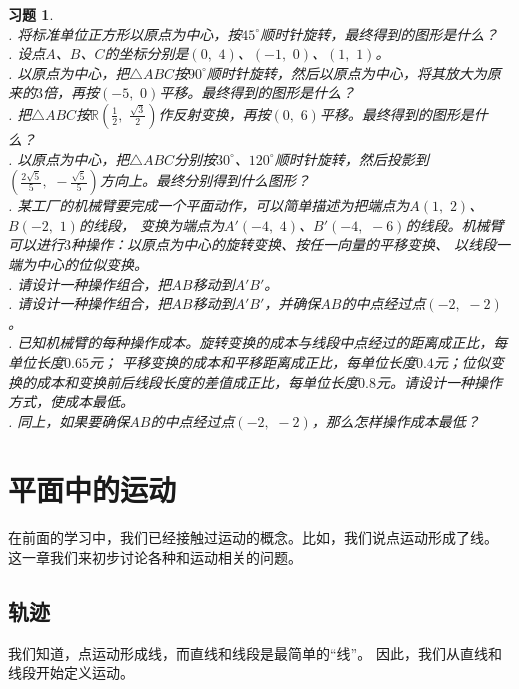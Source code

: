 \documentclass[12pt,UTF8]{ctexbook}
\theoremstyle{definition}
\theoremstyle{plain}
\newtheorem{xt}{习题}[section]
\begin{document}
\begin{xt}
    \mbox{}\\
    . 将标准单位正方形以原点为中心，按$45^\circ$顺时针旋转，最终得到的图形是什么？\\
    . 设点$A$、$B$、$C$的坐标分别是$(0,\,\, 4)$、$(-1,\,\, 0)$、$(1,\,\,1)$。\\
    . 以原点为中心，把$\triangle ABC$按$90^\circ$顺时针旋转，然后以原点为中心，将其放大为原来的$3$倍，再按$(-5, \,\, 0)$平移。最终得到的图形是什么？\\
    . 把$\triangle ABC$按$\mathbb{R}\left(\frac{1}{2},\,\, \frac{\sqrt{3}}{2}\right)$作反射变换，再按$(0,\,\, 6)$平移。最终得到的图形是什么？\\
    . 以原点为中心，把$\triangle ABC$分别按$30^\circ$、$120^\circ$顺时针旋转，然后投影到$\left(\frac{2\sqrt{5}}{5},\,\, -\frac{\sqrt{5}}{5}\right)$方向上。最终分别得到什么图形？\\
    . 某工厂的机械臂要完成一个平面动作，可以简单描述为把端点为$A(1,\,\, 2)$、$B(-2,\,\, 1)$的线段，
    变换为端点为$A'(-4,\,\, 4)$、$B'(-4,\,\, -6)$的线段。机械臂可以进行$3$种操作：以原点为中心的旋转变换、按任一向量的平移变换、
    以线段一端为中心的位似变换。\\
    . 请设计一种操作组合，把$AB$移动到$A'B'$。\\
    . 请设计一种操作组合，把$AB$移动到$A'B'$，并确保$AB$的中点经过点$(-2,\,\, -2)$。\\
    . 已知机械臂的每种操作成本。旋转变换的成本与线段中点经过的距离成正比，每单位长度$0.65$元；
    平移变换的成本和平移距离成正比，每单位长度$0.4$元；位似变换的成本和变换前后线段长度的差值成正比，每单位长度$0.8$元。请设计一种操作方式，使成本最低。\\
    . 同上，如果要确保$AB$的中点经过点$(-2,\,\, -2)$，那么怎样操作成本最低？
\end{xt}

\chapter{平面中的运动}
在前面的学习中，我们已经接触过运动的概念。比如，我们说点运动形成了线。
这一章我们来初步讨论各种和运动相关的问题。

\section{轨迹}
我们知道，点运动形成线，而直线和线段是最简单的“线”。
因此，我们从直线和线段开始定义运动。
\end{document}
